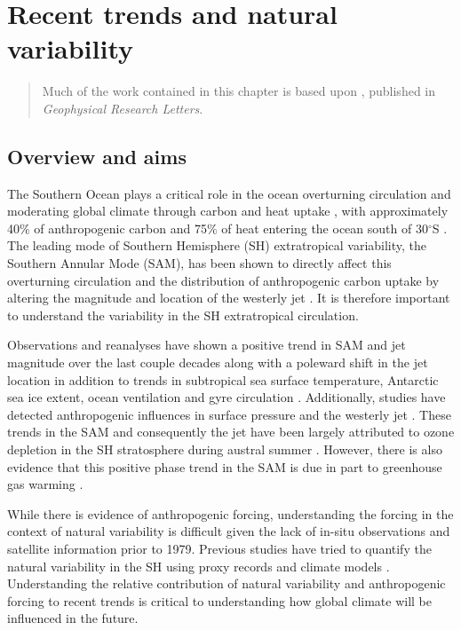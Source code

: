\chapter{Recent trends and natural variability}
\label{cha:SHcirc}

\begin{quotation}
  Much of the work contained in this chapter is based upon \citet{Thomas2015},
  published in \emph{Geophysical Research Letters}.
\end{quotation}

\section{Overview and aims}

The Southern Ocean plays a critical role in the ocean overturning circulation
and moderating global climate through carbon and heat uptake
\citep{Khatiwala2009,Gnanadesikan1999}, with approximately 40$\%$ of
anthropogenic carbon and 75$\%$ of heat entering the ocean south of 30$^\circ$S
\citep{Frolicher2015,Sabine2004}. The leading mode of Southern Hemisphere
(SH) extratropical variability, the Southern Annular Mode (SAM), has been shown
to directly affect this overturning circulation and the distribution of
anthropogenic carbon uptake by altering the magnitude and location of the
westerly jet \citep{Hall2002b,Mignone2006b,SenGupta2006e}.  It is
therefore important to understand the variability in the SH extratropical
circulation.

Observations and reanalyses have shown a positive trend in SAM and jet magnitude
over the last couple decades along with a poleward shift in the jet location
\citep{Thompson2000b,Thompson2002e} in addition to trends in subtropical sea
surface temperature, Antarctic sea ice extent, ocean ventilation and gyre
circulation \citep{Parkinson2012c,Swart2012a,Waugh2013b,Roemmich2007b}.
Additionally, studies have detected anthropogenic influences in surface pressure
and the westerly jet \citep{Gillett2003,Gillett2005}. These trends in the
SAM and consequently the jet have been largely attributed to ozone depletion in
the SH stratosphere during austral summer \citep{Previdi2014f,Gillett2013,
Gillett2003a}. However, there is also evidence that this positive phase trend
in the SAM is due in part to greenhouse gas warming \citep{Arblaster2006,
Lee2013f,Gillett2013}.

While there is evidence of anthropogenic forcing, understanding the forcing in
the context of natural variability is difficult given the lack of in-situ
observations and satellite information prior to 1979. Previous studies have
tried to quantify the natural variability in the SH using proxy records
\citep{MARSHALL2003,Visbeck2009} and climate models \citep{Latif2013}.
Understanding the relative contribution of natural variability and anthropogenic
forcing to recent trends is critical to understanding how global climate will be
influenced in the future.

